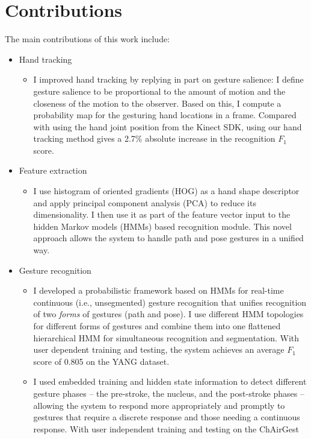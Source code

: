 \section{Contributions}
The main contributions of this work include:
\begin{itemize}
 \item Hand tracking
  \begin{itemize}
  \item I improved hand tracking by replying in part on gesture salience: I
  define gesture salience to be proportional to the amount of motion and the closeness
  of the motion to the observer. Based on this, I compute a probability map for
  the gesturing hand locations in a frame.  Compared with using the hand joint
  position from the Kinect SDK, using our hand tracking method gives a 2.7\%
  absolute increase in the recognition $F_1$ score.
  \end{itemize}
 \item Feature extraction
  \begin{itemize}
  \item I use histogram of oriented gradients (HOG) as a hand shape descriptor
  and apply principal component analysis (PCA) to reduce its dimensionality. I
  then use it as part of the feature vector input to the hidden Markov models
  (HMMs) based recognition module. This novel approach allows the system to
  handle path and pose gestures in a unified way.
  \end{itemize}
  \item Gesture recognition
    \begin{itemize}
    \item I developed a probabilistic framework based on HMMs for real-time
    continuous (i.e., unsegmented) gesture recognition that unifies recognition
    of two \textit{forms} of gestures (path and pose). I use different HMM
    topologies for different forms of gestures and combine them into one
    flattened hierarchical HMM for simultaneous recognition and segmentation. 
    With user dependent training and testing, the system achieves an average $F_1$ score of 0.805
    on the YANG dataset.
    \item I used embedded training and hidden state information to detect
    different gesture phases -- the pre-stroke, the nucleus, and the post-stroke
    phases -- allowing the system to respond more appropriately and promptly to
    gestures that require a discrete response and those needing a continuous
    response. With user independent training and testing on the ChAirGest

\end{itemize}
\end{itemize}

